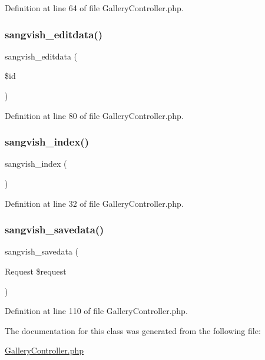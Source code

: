 Definition at line 64 of file Gallery\+Controller.\+php.

\mbox{\label{class_responsive_1_1_http_1_1_controllers_1_1_gallery_controller_a630f91fa525b55af595df8a2fbf882d4}} 
\subsubsection{\texorpdfstring{sangvish\_editdata()}{sangvish\_editdata()}}
{\footnotesize\ttfamily sangvish\+\_\+editdata (\begin{DoxyParamCaption}\item[{}]{\$id }\end{DoxyParamCaption})}



Definition at line 80 of file Gallery\+Controller.\+php.

\mbox{\label{class_responsive_1_1_http_1_1_controllers_1_1_gallery_controller_a102ddc90c5f30fa7831dcf999b905ad1}} 
\subsubsection{\texorpdfstring{sangvish\_index()}{sangvish\_index()}}
{\footnotesize\ttfamily sangvish\+\_\+index (\begin{DoxyParamCaption}{ }\end{DoxyParamCaption})}



Definition at line 32 of file Gallery\+Controller.\+php.

\mbox{\label{class_responsive_1_1_http_1_1_controllers_1_1_gallery_controller_a63d8d498a130e9f530dd9de0247a0c74}} 
\subsubsection{\texorpdfstring{sangvish\_savedata()}{sangvish\_savedata()}}
{\footnotesize\ttfamily sangvish\+\_\+savedata (\begin{DoxyParamCaption}\item[{Request}]{\$request }\end{DoxyParamCaption})\hspace{0.3cm}{\ttfamily [protected]}}



Definition at line 110 of file Gallery\+Controller.\+php.



The documentation for this class was generated from the following file\+:\begin{DoxyCompactItemize}
\item 
\mbox{\hyperlink{_gallery_controller_8php}{Gallery\+Controller.\+php}}\end{DoxyCompactItemize}
